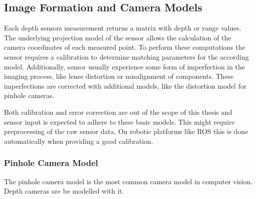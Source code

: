 \subsection{Image Formation and Camera Models}

Each depth sensors measurement returns a matrix with depth or range values.
The underlying projection model of the sensor allows the calculation of the camera coordinates of each measured point.
To perform these computations the sensor requires a calibration to determine matching parameters for the according model.
Additionally, sensor usually experience some form of imperfection in the imaging process, like lense distortion or misalignment of components.
These imperfections are corrected with additional models, like the distortion model for pinhole cameras.

Both calibration and error correction are out of the scope of this thesis and sensor input is expected to adhere to these basic models.
This might require preprocessing of the raw sensor data.
On robotic platforms like \acrshort{ROS} this is done automatically when providing a good calibration.

\subsubsection{Pinhole Camera Model}

The pinhole camera model is the most common camera model in computer vision.
Depth cameras are be modelled with it.

